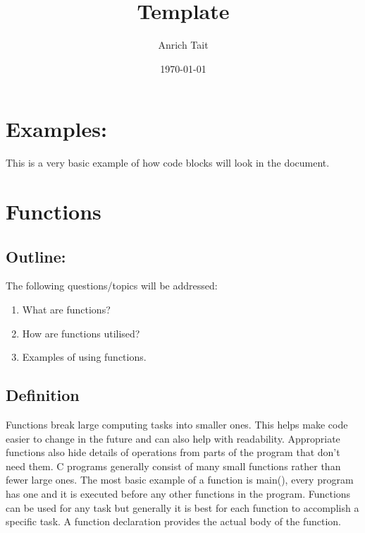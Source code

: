 \documentclass[12pt, letterpaper]{report}
\title{Template}
\author{Anrich Tait}
\date{\today}
\begin{document}
\restoregeometry %
\nopagecolor%

\tableofcontents

\chapter{Examples:}


	This is a very basic example of how code blocks will look in the document.


\chapter{Functions}
\section{Outline:}
	The following questions/topics will be addressed:
	\begin{enumerate}
		\item What are functions?
		\item How are functions utilised?
		\item Examples of using functions.
	\end{enumerate}

\section{Definition}
Functions break large computing tasks into smaller ones. This helps make code 
easier to change in the future and can also help  with readability. Appropriate 
functions also hide details of operations from parts of the program that don't 
need them. C programs generally consist of many small functions rather than fewer 
large ones. The most basic example of a function is main(), every program has one 
and it is executed before any other functions in the program. Functions can be 
used for any task but generally it is best for each function to accomplish a 
specific task. A function declaration provides the actual body of the function. \\
\end{document}
